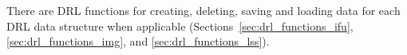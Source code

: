 There are \ac{DRL} functions for creating, deleting, saving and loading data for each \ac{DRL}
data structure when applicable (Sections~\ref{sec:drl_functions_ifu}, \ref{sec:drl_functions_img}, and \ref{sec:drl_functions_lss}).










